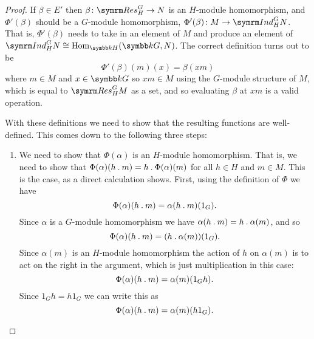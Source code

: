 \begin{thm}{}{}
\begin{proof}
        If \(\beta \in E'\) then \(\beta \colon \Res^G_H \to N\) is an \(H\)-module homomorphism, and \(\Phi'(\beta)\) should be a \(G\)-module homomorphism, \(\Phi'(\beta) \colon M \to \Ind^G_H N\).
        That is, \(\Phi'(\beta)\) needs to take in an element of \(M\) and produce an element of \(\Ind^G_HN \isomorphic \Hom_{\field H}(\field G, N)\).
        The correct definition turns out to be
        \begin{equation}
            \Phi'(\beta)(m)(x) = \beta(xm)
        \end{equation}
        where \(m \in M\) and \(x \in \field G\) so \(xm \in M\) using the \(G\)-module structure of \(M\), which is equal to \(\Res^G_HM\) as a set, and so evaluating \(\beta\) at \(xm\) is a valid operation.
        
        With these definitions we need to show that the resulting functions are well-defined.
        This comes down to the following three steps:
        \begin{enumerate}
            \item We need to show that \(\Phi(\alpha)\) is an \(H\)-module homomorphism.
            That is, we need to show that \(\Phi(\alpha)(h \mathbin{.} m) = h \mathbin{.} \Phi(\alpha)(m)\) for all \(h \in H\) and \(m \in M\).
            This is the case, as a direct calculation shows.
            First, using the definition of \(\Phi\) we have
            \begin{equation}
                \Phi(\alpha)(h \mathbin{.} m) = \alpha(h \mathbin{.} m)(1_G).
            \end{equation}
            Since \(\alpha\) is a \(G\)-module homomorphism we have \(\alpha(h \mathbin{.} m) = h \mathbin{.} \alpha(m)\), and so
            \begin{equation}
                \Phi(\alpha)(h \mathbin{.} m) = (h \mathbin{.} \alpha(m))(1_G).
            \end{equation}
            Since \(\alpha(m)\) is an \(H\)-module homomorphism the action of \(h\) on \(\alpha(m)\) is to act on the right in the argument, which is just multiplication in this case:
            \begin{equation}
                \Phi(\alpha)(h \mathbin{.} m) = \alpha(m)(1_Gh).
            \end{equation}
            Since \(1_Gh = h1_G\) we can write this as
            \begin{equation}
                \Phi(\alpha)(h \mathbin{.} m) = \alpha(m)(h1_G).
            \end{equation}

\end{enumerate}
\end{proof}
\end{thm}

